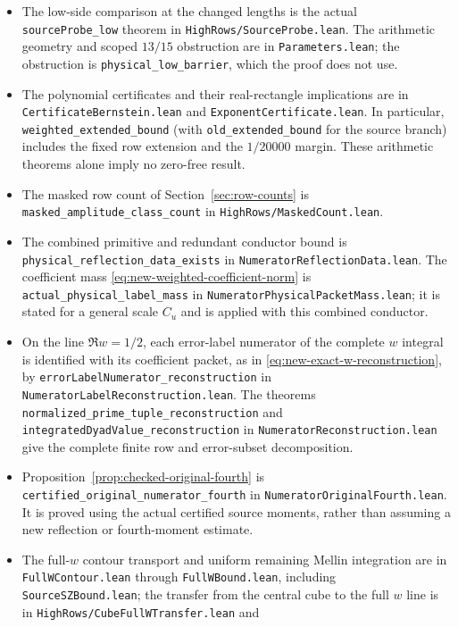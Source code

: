 \documentclass[11pt]{article}
\begin{document}
\begin{itemize}
\item The low-side comparison at the changed lengths is the actual
\nolinkurl{sourceProbe_low} theorem in \nolinkurl{HighRows/SourceProbe.lean}.
The arithmetic geometry and scoped $13/15$ obstruction are in
\nolinkurl{Parameters.lean}; the obstruction is
\nolinkurl{physical_low_barrier}, which the proof does not use.
\item The polynomial certificates and their real-rectangle implications
are in \nolinkurl{CertificateBernstein.lean} and
\nolinkurl{ExponentCertificate.lean}. In particular,
\nolinkurl{weighted_extended_bound} (with \nolinkurl{old_extended_bound}
for the source branch) includes the fixed row extension and
the $1/20000$ margin. These arithmetic theorems alone imply no
zero-free result.
\item The masked row count of Section~\ref{sec:row-counts} is
\nolinkurl{masked_amplitude_class_count} in
\nolinkurl{HighRows/MaskedCount.lean}.
\item The combined primitive and redundant conductor bound is
\nolinkurl{physical_reflection_data_exists} in
\nolinkurl{NumeratorReflectionData.lean}. The coefficient mass
\eqref{eq:new-weighted-coefficient-norm} is
\nolinkurl{actual_physical_label_mass} in
\nolinkurl{NumeratorPhysicalPacketMass.lean}; it is stated for a general
scale $C_u$ and is applied with this combined conductor.
\item On the line $\Re w=1/2$, each error-label numerator of the
complete $w$ integral is identified with its coefficient packet, as in
\eqref{eq:new-exact-w-reconstruction}, by
\nolinkurl{errorLabelNumerator_reconstruction} in
\nolinkurl{NumeratorLabelReconstruction.lean}. The theorems
\nolinkurl{normalized_prime_tuple_reconstruction} and
\nolinkurl{integratedDyadValue_reconstruction} in
\nolinkurl{NumeratorReconstruction.lean} give the complete finite row and
error-subset decomposition.
\item Proposition~\ref{prop:checked-original-fourth} is
\nolinkurl{certified_original_numerator_fourth} in
\nolinkurl{NumeratorOriginalFourth.lean}. It is proved using the actual
certified source moments, rather than assuming a new reflection or
fourth-moment estimate.
\item The full-$w$ contour transport and uniform remaining Mellin
integration are in \nolinkurl{FullWContour.lean} through
\nolinkurl{FullWBound.lean}, including \nolinkurl{SourceSZBound.lean}; the
transfer from the central cube to the full $w$ line is in
\nolinkurl{HighRows/CubeFullWTransfer.lean} and

\end{itemize}
\end{document}
